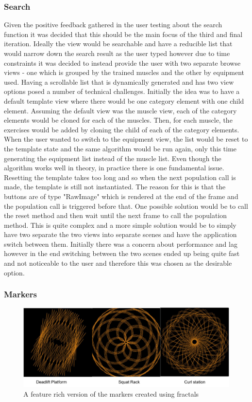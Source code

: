 \documentclass{l4proj}
\begin{document}
\subsubsection{Search}
Given the positive feedback gathered in the user testing about the search function it was decided that this should be the main focus of the third and final iteration. Ideally the view would be searchable and have a reducible list that would narrow down the search result as the user typed however due to time constraints it was decided to instead provide the user with two separate browse views - one which is grouped by the trained muscles and the other by equipment used. Having a scrollable list that is dynamically generated and has two view options posed a number of technical challenges. Initially the idea was to have a default template view where there would be one category element with one child element. Assuming the default view was the muscle view, each of the category elements would be cloned for each of the muscles. Then, for each muscle, the exercises would be added by cloning the child of each of the category elements. When the user wanted to switch to the equipment view, the list would be reset to the template state and the same algorithm would be run again, only this time generating the equipment list instead of the muscle list. Even though the algorithm works well in theory, in practice there is one fundamental issue. Resetting the template takes too long and so when the next population call is made, the template is still not instantiated. The reason for this is that the buttons are of type "RawImage" which is rendered at the end of the frame and the population call is triggered before that. One possible solution would be to call the reset method and then wait until the next frame to call the population method. This is quite complex and a more simple solution would be to simply have two separate the two views into separate scenes and have the application switch between them. Initially there was a concern about performance and lag however in the end switching between the two scenes ended up being quite fast and not noticeable to the user and therefore this was chosen as the desirable option.

\subsubsection{Markers}
\begin{figure}
\centering
\includegraphics[width=\textwidth]{images/fractal_marker.png}
\caption{A feature rich version of the markers created using fractals} 
\label{fig:fractal_marker}
\end{figure}
\end{document}
